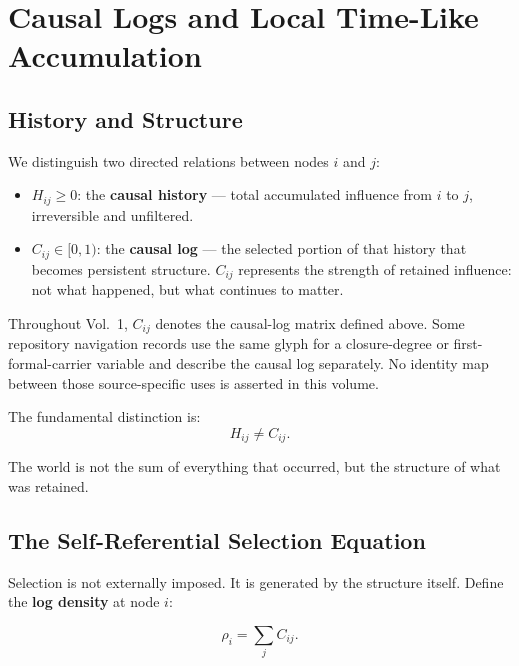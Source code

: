 \section{Causal Logs and Local Time-Like Accumulation}
\label{sec:time}

\subsection{History and Structure}

We distinguish two directed relations between nodes $i$ and $j$:

\begin{itemize}
  \item $H_{ij} \geq 0$: the \textbf{causal history} ---
    total accumulated influence from $i$ to $j$, irreversible and unfiltered.
  \item $C_{ij} \in [0,1)$: the \textbf{causal log} ---
    the selected portion of that history that becomes persistent structure.
    $C_{ij}$ represents the strength of retained influence:
    not what happened, but what continues to matter.
\end{itemize}

\begin{remark}
Throughout Vol.~1, $C_{ij}$ denotes the causal-log matrix defined above.
Some repository navigation records use the same glyph for a closure-degree
or first-formal-carrier variable and describe the causal log separately.
No identity map between those source-specific uses is asserted in this volume.
\end{remark}

The fundamental distinction is:
\begin{equation}
  H_{ij} \neq C_{ij}.
  \label{eq:HneqC}
\end{equation}

The world is not the sum of everything that occurred,
but the structure of what was retained.

\subsection{The Self-Referential Selection Equation}

Selection is not externally imposed. It is generated by the structure itself.
Define the \textbf{log density} at node $i$:

\begin{equation}
  \rho_i = \sum_j C_{ij}.
  \label{eq:rho}
\end{equation}

